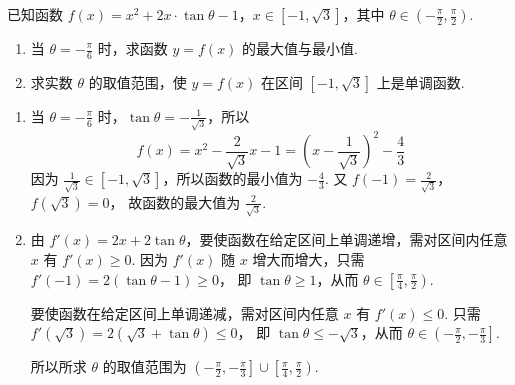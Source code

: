 \begin{problem}
已知函数 \(f(x) = x^2 + 2x \cdot \tan \theta - 1\)，\(x \in [-1, \sqrt{3}]\)，其中 \(\theta \in \left(-\frac{\pi}{2}, \frac{\pi}{2}\right)\).

\begin{enumerate}
\item 当 \(\theta = -\frac{\pi}{6}\) 时，求函数 \(y = f(x)\) 的最大值与最小值.
\item 求实数 \(\theta\) 的取值范围，使 \(y = f(x)\) 在区间 \([-1, \sqrt{3}]\) 上是单调函数.
\end{enumerate}
\end{problem}

\begin{solution}
\begin{enumerate}
\item 当 \(\theta=-\frac{\pi}{6}\) 时，\(\tan\theta=-\frac{1}{\sqrt{3}}\)，所以
\[
f(x)=x^2-\frac{2}{\sqrt{3}}x-1=\left(x-\frac{1}{\sqrt{3}}\right)^2-\frac{4}{3}
\]
因为 \(\frac{1}{\sqrt{3}}\in[-1,\sqrt{3}]\)，所以函数的最小值为 \(-\frac{4}{3}\). 又
\(f(-1)=\frac{2}{\sqrt{3}}\)，\(f(\sqrt{3})=0\)，
故函数的最大值为 \(\frac{2}{\sqrt{3}}\).

\item 由 \(f'(x)=2x+2\tan\theta\)，要使函数在给定区间上单调递增，需对区间内任意 \(x\) 有 \(f'(x)\geqslant0\). 因为 \(f'(x)\) 随 \(x\) 增大而增大，只需
\(f'(-1)=2(\tan\theta-1)\geqslant0\)，
即 \(\tan\theta\geqslant1\)，从而 \(\theta\in\left[\frac{\pi}{4},\frac{\pi}{2}\right)\).

要使函数在给定区间上单调递减，需对区间内任意 \(x\) 有 \(f'(x)\leqslant0\). 只需
\(f'(\sqrt{3})=2(\sqrt{3}+\tan\theta)\leqslant0\)，
即 \(\tan\theta\leqslant-\sqrt{3}\)，从而 \(\theta\in\left(-\frac{\pi}{2},-\frac{\pi}{3}\right]\).

所以所求 \(\theta\) 的取值范围为 \(\left(-\frac{\pi}{2},-\frac{\pi}{3}\right]\cup\left[\frac{\pi}{4},\frac{\pi}{2}\right)\).
\end{enumerate}
\end{solution}

